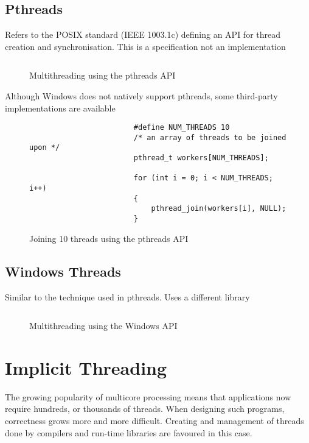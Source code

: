\documentclass[oneside]{book}
\begin{document}
            \subsection{Pthreads}
                Refers to the POSIX standard (IEEE 1003.1c) defining an API for thread creation and synchronisation.
                This is a specification not an implementation
                \begin{figure}[H]
                    \centering
                    \inputminted{c}{code/threads/pthreads.c}
                    \caption{Multithreading using the pthreads API}
                \end{figure}
                Although Windows does not natively support pthreads, some third-party implementations are available
                \begin{figure}[H]
                    \centering
                    \begin{verbatim}
                        #define NUM_THREADS 10
                        /* an array of threads to be joined upon */
                        pthread_t workers[NUM_THREADS];

                        for (int i = 0; i < NUM_THREADS; i++)
                        {
                            pthread_join(workers[i], NULL);
                        }
                    \end{verbatim}
                    \caption{Joining 10 threads using the pthreads API}
                \end{figure}
            \subsection{Windows Threads}
                Similar to the technique used in pthreads. Uses a different library
                \begin{figure}[H]
                    \centering
                    \inputminted{c}{code/threads/windows_threads.c}
                    \caption{Multithreading using the Windows API}
                \end{figure}
        \section{Implicit Threading}
            The growing popularity of multicore processing means that applications now require hundreds,
            or thousands of threads. When designing such programs, correctness grows more and more difficult.
            Creating and management of threads done by compilers and run-time libraries are favoured in this case.
\end{document}
